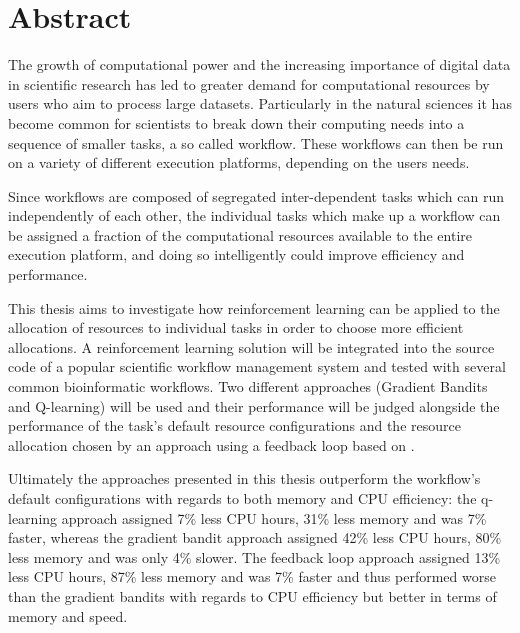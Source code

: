 
\cleardoublepage
{}
\section*{Abstract}

The growth of computational power and the increasing importance of digital data in scientific research has led to greater demand for computational resources  by users who aim to process large datasets. Particularly in the natural sciences it has become common for scientists to break down their computing needs into a sequence of smaller tasks, a so called workflow. These workflows can then be run on a variety of different execution platforms, depending on the users needs.

Since workflows are composed of segregated inter-dependent tasks which can run independently of each other, the individual tasks which make up a workflow can be assigned a fraction of the computational resources available to the entire execution platform, and doing so intelligently could improve efficiency and performance.

This thesis aims to investigate how reinforcement learning can be applied to the allocation of resources to individual tasks in order to choose more efficient allocations. A reinforcement learning solution will be integrated into the source code of a popular scientific workflow management system and tested with several common bioinformatic workflows. Two different approaches (Gradient Bandits and Q-learning) will be used and their performance will be judged alongside the performance of the task's default resource configurations and the resource allocation chosen by an approach using a feedback loop based on \cite{tovarjob,FeedbackBasedAllocation}.

Ultimately the approaches presented in this thesis outperform the workflow's default configurations with regards to both memory and CPU efficiency: the q-learning approach assigned 7\% less CPU hours, 31\% less memory and was 7\% faster, whereas the gradient bandit approach assigned 42\% less CPU hours, 80\% less memory and was only 4\% slower. The feedback loop approach assigned 13\% less CPU hours, 87\% less memory and was 7\% faster and thus performed worse than the gradient bandits with regards to CPU efficiency but better in terms of memory and speed. 

{}
